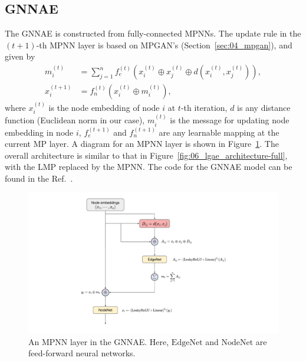 \subsection{GNNAE}
The GNNAE is constructed from fully-connected MPNNs.
The update rule in the $(t+1)$-th MPNN layer is based on MPGAN's (Section~\ref{sec:04_mpgan}), and given by
\begin{align}
    m_i^{(t)}   & = \sum_{j=1}^n f_e^{(t)}\left(
    x_i^{(t)} \oplus x_j^{(t)} \oplus d\left(x_i^{(t)}, x_j^{(t)}\right)
    \right), \label{eq:06_lgae_gnnae-m}                  \\
    x_i^{(t+1)} & = f_n^{(t)} \left(
    x_i^{(t)} \oplus m_i^{(t)}
    \right), \label{eq:06_lgae_gnnae-x}
\end{align}
where $x_i^{(t)}$ is the node embedding of node $i$ at $t$-th iteration,
$d$ is any distance function (Euclidean norm in our case),
$m_i^{(t)}$ is the message for updating node embedding in node $i$,
$f_e^{(t+1)}$ and $f_n^{(t+1)}$ are any learnable mapping at the current MP layer.
A diagram for an MPNN layer is shown in Figure~\ref{fig:06_lgae_gnn-message-passing}.
The overall architecture is similar to that in Figure~\ref{fig:06_lgae_architecture-full}, with the LMP replaced by the MPNN.
The code for the GNNAE model can be found in the Ref.~\cite{GNNAE_code}.

\begin{figure}[htpb]
    \centering
    \includegraphics[scale=0.55]{figures/06-ML4Jets/lgae/architectures/GNNAE-MPNN.pdf}
    \caption{An MPNN layer in the GNNAE. Here, $\mathrm{EdgeNet}$ and $\mathrm{NodeNet}$ are feed-forward neural networks.}
    \label{fig:06_lgae_gnn-message-passing}
\end{figure}

